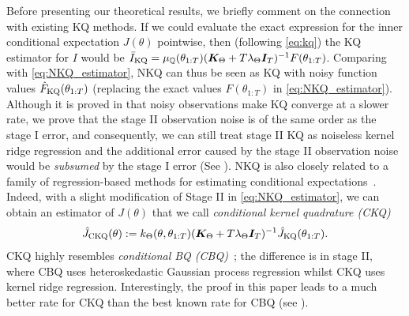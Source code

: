 Before presenting our theoretical results, we briefly comment on the connection with existing KQ methods.
If we could evaluate the exact expression for the inner conditional expectation $J(\theta)$ pointwise, then (following \eqref{eq:kq}) the KQ estimator for $I$ would be $\bar{I}_{\text{KQ}} = \mu_{\mathbb{Q}}(\theta_{1:T}) ( \boldsymbol{K}_\Theta + T \lambda_\Theta \boldsymbol{I}_T)^{-1} F( \theta_{1:T})$. Comparing with \eqref{eq:NKQ_estimator}, NKQ can thus be seen as KQ with noisy function values $\hat{F}_{\text{KQ}}( \theta_{1:T} )$ (replacing the exact values $F( \theta_{1:T})$ in \eqref{eq:NKQ_estimator}). 
Although it is proved in \citet{Cai2023} that noisy observations make KQ converge at a slower rate, we prove that the stage II observation noise is of the same order as the stage I error, and consequently, we can still treat stage II KQ as noiseless kernel ridge regression and the additional error caused by the stage II observation noise would be \emph{subsumed} by the stage I error (See ).
NKQ is also closely related to a family of regression-based methods for estimating conditional expectations~\citep{longstaff2001valuing,chen2024conditional}. Indeed, with a slight modification of Stage II in \eqref{eq:NKQ_estimator}, we can obtain an estimator of $J(\theta)$ that we call \emph{conditional kernel quadrature (CKQ)} 
\begin{align}\label{eq:ckq}
    \hat{J}_{\text{CKQ}}(\theta) := k_\Theta(\theta, \theta_{1:T}) ( \boldsymbol{K}_\Theta + T \lambda_\Theta \boldsymbol{I}_T)^{-1} \hat{J}_{\text{KQ}}( \theta_{1:T}) .
\end{align}
CKQ highly resembles \textit{conditional BQ (CBQ)}~\citep{chen2024conditional}; the difference is in stage II, where CBQ uses heteroskedastic Gaussian process regression whilst CKQ uses kernel ridge regression. Interestingly, the proof in this paper leads to a much better rate for CKQ than the best known rate for CBQ (see ).






